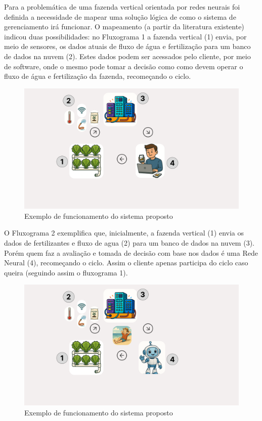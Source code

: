Para a problemática de uma fazenda vertical orientada por redes neurais foi definida a necessidade de mapear uma solução lógica de como o sistema de gerenciamento irá funcionar. O mapeamento (a partir da literatura existente) indicou duas possibilidades: no Fluxograma 1 a fazenda vertical (1) envia, por meio de sensores, os dados atuais de fluxo de água e fertilização para um banco de dados na nuvem (2). Estes dados podem ser acessados pelo cliente, por meio de software, onde o mesmo pode tomar a decisão como como devem operar o fluxo de água e fertilização da fazenda, recomeçando o ciclo.
\begin{figure}[h!]
    \centering
    \includegraphics[scale=0.2]{Illustrations/Fluxograma1.png} %
    \caption{Exemplo de funcionamento do sistema proposto}
    \label{fcht:fluxograma1}
\end{figure}

O Fluxograma 2 exemplifica que, inicialmente, a fazenda vertical (1) envia os dados de fertilizantes e fluxo de agua (2) para um banco de dados na nuvem (3). Porém quem faz a avaliação e tomada de decisão com base nos dados é uma Rede Neural (4), recomeçando o ciclo. Assim o cliente apenas participa do ciclo caso queira (seguindo assim o fluxograma 1).

\begin{figure}[h!]
    \centering
    \includegraphics[scale=0.2]{Illustrations/Fluxograma2.png} %
    \caption{Exemplo de funcionamento do sistema proposto}
    \label{fcht:fluxograma2}
\end{figure}


